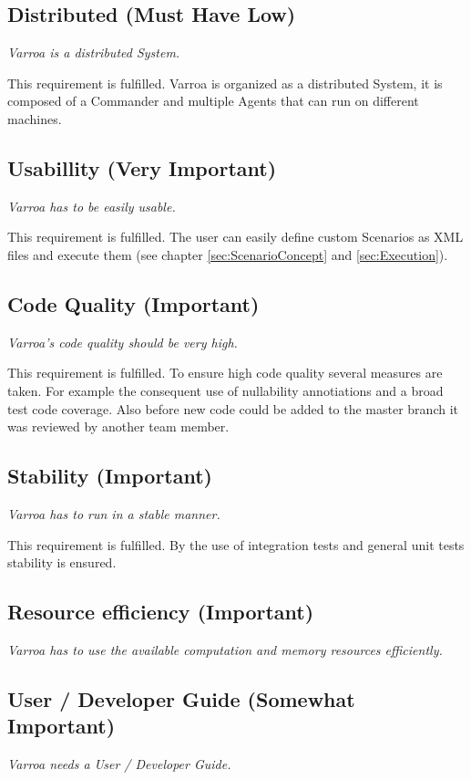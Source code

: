 \subsection{Distributed (Must Have Low)} 
\emph{Varroa is a distributed System.}

This requirement is fulfilled.
Varroa is organized as a distributed System, it is composed of a Commander and multiple Agents that can run on different machines. 
 
\subsection{Usabillity (Very Important)} 
\emph{Varroa has to be easily usable.}

This requirement is fulfilled.
The user can easily define custom Scenarios as XML files and execute them (see chapter \ref{sec:ScenarioConcept} and \ref{sec:Execution}).

\subsection{Code Quality (Important)} 
\emph{Varroa's code quality should be very high.}

This requirement is fulfilled.
To ensure high code quality several measures are taken.
For example the consequent use of nullability annotiations and a broad test code coverage.
Also before new code could be added to the master branch it was reviewed by another team member.

\subsection{Stability (Important)} 
\emph{Varroa has to run in a stable manner.}

This requirement is fulfilled.
By the use of integration tests and general unit tests stability is ensured.

\subsection{Resource efficiency (Important)} 
\emph{Varroa has to use the available computation and memory resources efficiently.}

\subsection{User / Developer Guide (Somewhat Important)} 
\emph{Varroa needs a User / Developer Guide.}

